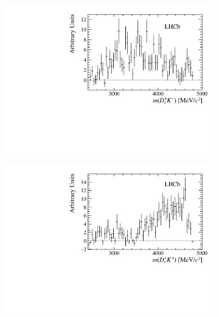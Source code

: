 \begin{figure}[!h]
    \centering
    \begin{subfigure}[t]{0.4\textwidth}
        \includegraphics[width=1.0\textwidth]{figs/B2DsKK/DsKm_mass_sweighted.pdf}
    \end{subfigure}
    \begin{subfigure}[t]{0.4\textwidth}
        \includegraphics[width=1.0\textwidth]{figs/B2DsKK/DsKp_mass_sweighted.pdf}
    \end{subfigure}
    \begin{subfigure}[t]{0.4\textwidth}

\end{subfigure}
\end{figure}
